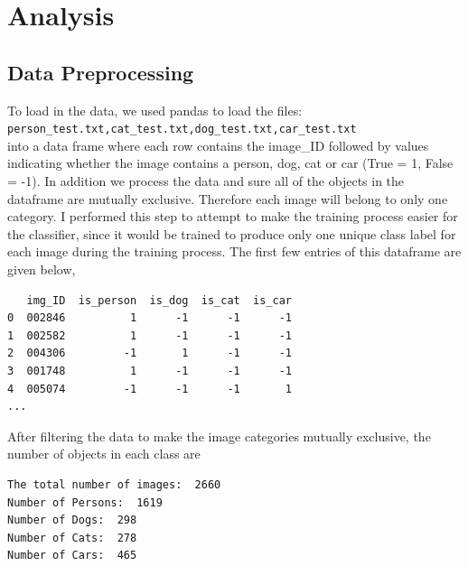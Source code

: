\documentclass[10pt,a4paper]{article}
\begin{document}
\newpage
\section{Analysis}

\subsection{Data Preprocessing}
%

To load in the data, we used pandas to load the files:\\ 
\lstinline{person_test.txt,cat_test.txt,dog_test.txt,car_test.txt}\\
into a data frame where each row contains the image\_ID followed by values indicating whether the image contains a person, dog, cat or car (True = 1, False = -1). In addition we process the data and sure all of the objects in the dataframe are mutually exclusive. Therefore each image will belong to only one category. I performed this step to attempt to make the training process easier for the classifier, since it would be trained to produce only one unique class label  for each image during the training process. The first few entries of this dataframe are given below,
\begin{lstlisting}
   img_ID  is_person  is_dog  is_cat  is_car
0  002846          1      -1      -1      -1
1  002582          1      -1      -1      -1
2  004306         -1       1      -1      -1
3  001748          1      -1      -1      -1
4  005074         -1      -1      -1       1
...
\end{lstlisting}
After filtering the data to make the image categories mutually exclusive, the number of objects in each class are
\begin{lstlisting}
The total number of images:  2660
Number of Persons:  1619
Number of Dogs:  298
Number of Cats:  278
Number of Cars:  465
\end{lstlisting}
\end{document}
